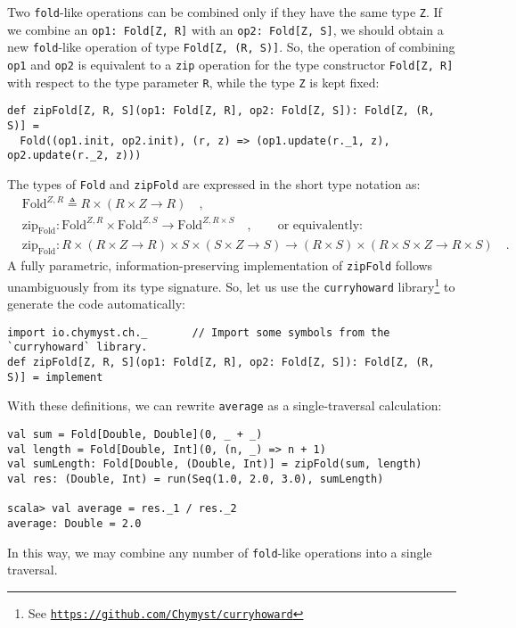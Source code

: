 Two \lstinline!fold!-like operations can be combined only if they
have the same type \lstinline!Z!. If we combine an \lstinline!op1: Fold[Z, R]!
with an \lstinline!op2: Fold[Z, S]!, we should obtain a new \lstinline!fold!-like
operation of type \lstinline!Fold[Z, (R, S)]!. So, the operation
of combining \lstinline!op1! and \lstinline!op2! is equivalent to
a \lstinline!zip! operation for the type constructor \lstinline!Fold[Z, R]!
with respect to the type parameter \lstinline!R!, while the type
\lstinline!Z! is kept fixed:
\begin{lstlisting}
def zipFold[Z, R, S](op1: Fold[Z, R], op2: Fold[Z, S]): Fold[Z, (R, S)] =
  Fold((op1.init, op2.init), (r, z) => (op1.update(r._1, z), op2.update(r._2, z)))
\end{lstlisting}

The types of \lstinline!Fold! and \lstinline!zipFold! are expressed
in the short type notation as:
\begin{align*}
 & \text{Fold}^{Z,R}\triangleq R\times\left(R\times Z\rightarrow R\right)\quad,\\
 & \text{zip}_{\text{Fold}}:\text{Fold}^{Z,R}\times\text{Fold}^{Z,S}\rightarrow\text{Fold}^{Z,R\times S}\quad,\quad\quad\text{or equivalently:}\\
 & \text{zip}_{\text{Fold}}:R\times\left(R\times Z\rightarrow R\right)\times S\times\left(S\times Z\rightarrow S\right)\rightarrow\left(R\times S\right)\times(R\times S\times Z\rightarrow R\times S)\quad.
\end{align*}
A fully parametric, information-preserving implementation of \lstinline!zipFold!
follows unambiguously from its type signature. So, let us use the
\lstinline!curryhoward!
library\footnote{See \texttt{\href{https://github.com/Chymyst/curryhoward}{https://github.com/Chymyst/curryhoward}}}
to generate the code automatically:
\begin{lstlisting}
import io.chymyst.ch._       // Import some symbols from the `curryhoward` library.
def zipFold[Z, R, S](op1: Fold[Z, R], op2: Fold[Z, S]): Fold[Z, (R, S)] = implement
\end{lstlisting}

With these definitions, we can rewrite \lstinline!average! as a single-traversal
calculation:
\begin{lstlisting}
val sum = Fold[Double, Double](0, _ + _)
val length = Fold[Double, Int](0, (n, _) => n + 1)
val sumLength: Fold[Double, (Double, Int)] = zipFold(sum, length)
val res: (Double, Int) = run(Seq(1.0, 2.0, 3.0), sumLength)

scala> val average = res._1 / res._2
average: Double = 2.0
\end{lstlisting}
In this way, we may combine any number of \lstinline!fold!-like operations
into a single traversal. 

